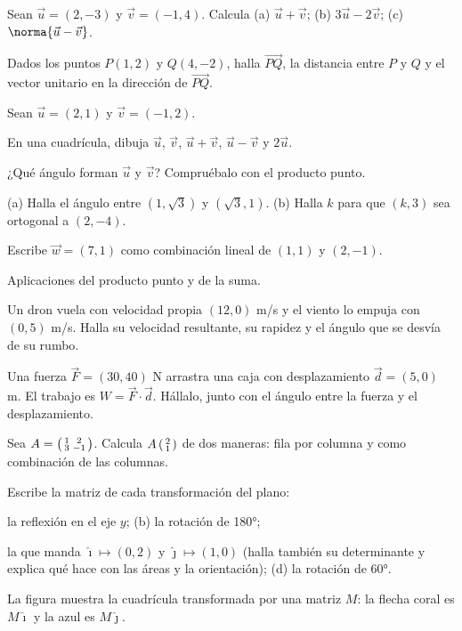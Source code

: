 \documentclass[11pt,a4paper]{article}
\newcommand{\ii}{\hat{\imath}}
\newcommand{\jj}{\hat{\jmath}}
\newcommand{\vecdos}[2]{\mathchoice{\begin{pmatrix}#1\\ #2\end{pmatrix}}{\left(\begin{smallmatrix}#1\\ #2\end{smallmatrix}\right)}{\left(\begin{smallmatrix}#1\\ #2\end{smallmatrix}\right)}{\left(\begin{smallmatrix}#1\\ #2\end{smallmatrix}\right)}}
\newcommand{\matdos}[4]{\mathchoice{\begin{pmatrix}#1 & #2\\ #3 & #4\end{pmatrix}}{\left(\begin{smallmatrix}#1 & #2\\ #3 & #4\end{smallmatrix}\right)}{\left(\begin{smallmatrix}#1 & #2\\ #3 & #4\end{smallmatrix}\right)}{\left(\begin{smallmatrix}#1 & #2\\ #3 & #4\end{smallmatrix}\right)}}
\begin{document}
\taller
\begin{ejercicios}
\item Sean $\vec u=(2,-3)$ y $\vec v=(-1,4)$. Calcula (a) $\vec u+\vec v$; (b) $3\vec u-2\vec v$; (c) $\norma{\vec u-\vec v}$.
\item Dados los puntos $P(1,2)$ y $Q(4,-2)$, halla $\overrightarrow{PQ}$, la distancia entre $P$ y $Q$ y el vector
  unitario en la dirección de $\overrightarrow{PQ}$.
\item Sean $\vec u=(2,1)$ y $\vec v=(-1,2)$.
  \begin{ejercicios}
  \item En una cuadrícula, dibuja $\vec u$, $\vec v$, $\vec u+\vec v$, $\vec u-\vec v$ y $2\vec u$.
  \item ¿Qué ángulo forman $\vec u$ y $\vec v$? Compruébalo con el producto punto.
  \end{ejercicios}
\item (a) Halla el ángulo entre $(1,\sqrt3)$ y $(\sqrt3,1)$. (b) Halla $k$ para que $(k,3)$ sea ortogonal a $(2,-4)$.
\item Escribe $\vec w=(7,1)$ como combinación lineal de $(1,1)$ y $(2,-1)$.
\item Aplicaciones del producto punto y de la suma.
  \begin{ejercicios}
  \item Un dron vuela con velocidad propia $(12,0)$ \si{m/s} y el viento lo empuja con $(0,5)$ \si{m/s}. Halla su
    velocidad resultante, su rapidez y el ángulo que se desvía de su rumbo.
  \item Una fuerza $\vec F=(30,40)$ \si{N} arrastra una caja con desplazamiento $\vec d=(5,0)$ \si{m}. El trabajo es
    $W=\vec F\cdot\vec d$. Hállalo, junto con el ángulo entre la fuerza y el desplazamiento.
  \end{ejercicios}
\item Sea $A=\matdos12{3}{-1}$. Calcula $A\vecdos21$ de dos maneras: fila por columna y como combinación de las columnas.
\item Escribe la matriz de cada transformación del plano:
  \begin{ejercicios}
  \item la reflexión en el eje $y$; \quad (b) la rotación de \ang{180};
  \item[(c)] la que manda $\ii\mapsto(0,2)$ y $\jj\mapsto(1,0)$ (halla también su determinante y explica qué hace con
    las áreas y la orientación); \quad (d) la rotación de \ang{60}.
  \end{ejercicios}
\item La figura muestra la cuadrícula transformada por una matriz $M$: la flecha coral es $M\ii$ y la azul es $M\jj$.


\end{ejercicios}
\end{document}
